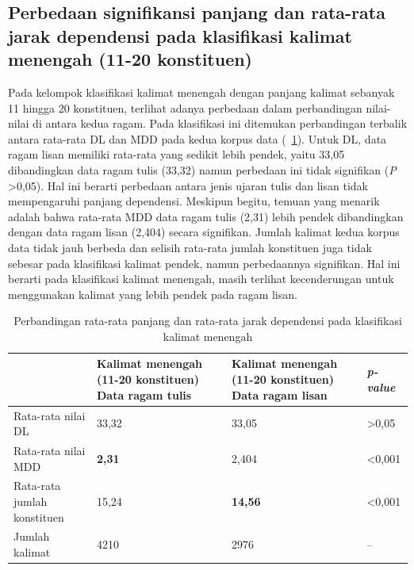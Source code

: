 \subsection{Perbedaan signifikansi panjang dan rata-rata jarak dependensi pada klasifikasi kalimat menengah (11-20 konstituen)}
Pada kelompok klasifikasi kalimat menengah dengan panjang kalimat sebanyak 11 hingga 20 konstituen, terlihat adanya perbedaan dalam perbandingan nilai-nilai di antara kedua ragam. Pada klasifikasi ini ditemukan perbandingan terbalik antara rata-rata DL dan MDD pada kedua korpus data (\tab~\ref{tab:DL_MDD_menengah}). Untuk DL, data ragam lisan memiliki rata-rata yang sedikit lebih pendek, yaitu 33,05 dibandingkan data ragam tulis (33,32) namun perbedaan ini tidak signifikan (\textit{P} \textgreater 0,05). Hal ini berarti perbedaan antara jenis ujaran tulis dan lisan tidak mempengaruhi panjang dependensi. Meskipun begitu, temuan yang menarik adalah bahwa rata-rata MDD data ragam tulis (2,31) lebih pendek dibandingkan dengan data ragam lisan (2,404) secara signifikan. Jumlah kalimat kedua korpus data tidak jauh berbeda dan selisih rata-rata jumlah konstituen juga tidak sebesar pada klasifikasi kalimat pendek, namun perbedaannya signifikan. Hal ini berarti pada klasifikasi kalimat menengah, masih terlihat kecenderungan untuk menggunakan kalimat yang lebih pendek pada ragam lisan.  

\begin{table}
\begin{center}
\begin{small}
 \caption{Perbandingan rata-rata panjang dan rata-rata jarak dependensi pada klasifikasi kalimat menengah}\label{tab:DL_MDD_menengah}  
 \begin{tabular}{| p{3.2cm} | p{3.2cm} | p{3.2cm} | p{2cm} |}
    \hline
 & Kalimat menengah \newline (11-20 konstituen) \newline Data ragam tulis & Kalimat menengah \newline (11-20 konstituen) \newline Data ragam lisan & \textit{p-value} \\ \hline
 Rata-rata nilai DL & 33,32 & 33,05 & \textgreater 0,05  \\ \hline
 Rata-rata nilai MDD & \textbf{2,31} & 2,404 & \textless 0,001 \\ \hline
 Rata-rata jumlah konstituen & 15,24 & \textbf{14,56} & \textless 0,001 \\ \hline
 Jumlah kalimat & 4210 & 2976 & -- \\ \hline
   \end{tabular}
   \end{small}
\end{center}
\end{table}

